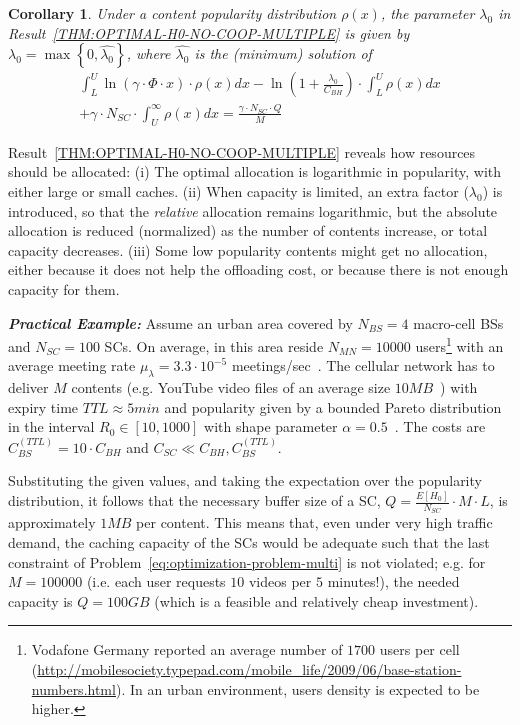 \documentclass[10pt,conference,letterpaper]{IEEEtran}
\newtheorem{corollary}{Corollary}
\begin{document}
\begin{corollary}\label{thm:corollary}
Under a content popularity distribution $\rho(x)$, the parameter $\lambda_{0}$ in Result~\ref{THM:OPTIMAL-H0-NO-COOP-MULTIPLE} is given by $\lambda_{0} = \max\left\{0,\hat{\lambda_{0}}\right\}$, where $\hat{\lambda_{0}}$ is the (minimum) solution of
\begin{multline*}
\int_{L}^{U}\ln\left(\gamma\cdot\Phi\cdot x\right)\cdot \rho(x)dx - \ln\left(1+\frac{\lambda_{0}}{C_{BH}}\right)\cdot \int_{L}^{U}\rho(x)dx \\
	+\gamma\cdot N_{SC}\cdot \int_{U}^{\infty} \rho(x)dx = \frac{\gamma\cdot N_{SC}\cdot Q}{M}
\end{multline*}
\end{corollary}

Result~\ref{THM:OPTIMAL-H0-NO-COOP-MULTIPLE} reveals how resources should be allocated:
(i) The optimal allocation is logarithmic in popularity, with either large or small caches. (ii) When capacity is limited, an extra factor ($\lambda_{0}$) is introduced, so that the \emph{relative} allocation remains logarithmic, but the absolute allocation is reduced (normalized) as the number of contents increase, or total capacity decreases. (iii) Some low popularity contents might get no allocation, either because it does not help the offloading cost, or because there is not enough capacity for them.



\textbf{\textit{Practical Example:}} Assume an urban area covered by $N_{BS}=4$ macro-cell BSs and $N_{SC}=100$ SCs. On average, in this area reside $N_{MN}=10000$ users\footnote{Vodafone Germany reported an average number of $1700$ users per cell (\url{http://mobilesociety.typepad.com/mobile_life/2009/06/base-station-numbers.html}). In an urban environment, users density is expected to be higher.} with an average meeting rate $\mu_{\lambda} = 3.3\cdot 10^{-5}$ meetings/sec~\cite{infocom-trace}. The cellular network has to deliver $M$ contents (e.g. YouTube video files of an average size $10MB$~\cite{youtube-traffic-from-edge}) with expiry time $TTL\approx 5min$ and popularity given by a bounded Pareto distribution in the interval $R_{0}\in[10, 1000]$ with shape parameter $\alpha = 0.5$~\cite{youtube-traffic-from-edge}. The costs are $C_{BS}^{(TTL)} = 10\cdot C_{BH}$ and $C_{SC}\ll C_{BH},C_{BS}^{(TTL)}$.

Substituting the given values, and taking the expectation over the popularity distribution, it follows that the necessary buffer size of a SC, $Q =\frac{E[H_{0}]}{N_{SC}}\cdot M\cdot L$, is approximately $1 MB$ per content. This means that, even under very high traffic demand, the caching capacity of the SCs would be adequate such that the last constraint of Problem~\ref{eq:optimization-problem-multi} is not violated; e.g. for $M=100000$ (i.e. each user requests $10$ videos per $5$ minutes!), the needed capacity is $Q=100GB$ (which is a feasible and relatively cheap investment). 
\end{document}
